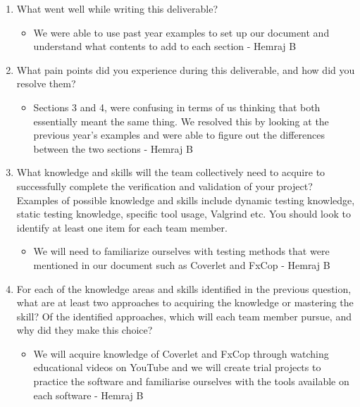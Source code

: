 \documentclass[12pt, titlepage]{article}
\begin{document}
\begin{enumerate}
  \item What went well while writing this deliverable? 
  \begin{itemize}
    \item We were able to use past year examples to set up our document and understand what contents to add to each section - Hemraj B
  \end{itemize}
  \item What pain points did you experience during this deliverable, and how
    did you resolve them?
    \begin{itemize}
      \item Sections 3 and 4, were confusing in terms of us thinking that both essentially meant the same thing. We resolved this by looking at the previous year's examples and were able to figure out the differences between the two sections - Hemraj B
    \end{itemize}
  \item What knowledge and skills will the team collectively need to acquire to
  successfully complete the verification and validation of your project?
  Examples of possible knowledge and skills include dynamic testing knowledge,
  static testing knowledge, specific tool usage, Valgrind etc.  You should look to
  identify at least one item for each team member.
  \begin{itemize}
    \item We will need to familiarize ourselves with testing methods that were mentioned in our document such as Coverlet and FxCop  - Hemraj B
  \end{itemize}
  \item For each of the knowledge areas and skills identified in the previous
  question, what are at least two approaches to acquiring the knowledge or
  mastering the skill?  Of the identified approaches, which will each team
  member pursue, and why did they make this choice?
  \begin{itemize}
    \item We will acquire knowledge of Coverlet and FxCop through watching educational videos on YouTube and we will create trial projects to practice the software and familiarise ourselves with the tools available on each software - Hemraj B
  \end{itemize}
\end{enumerate}
\end{document}
